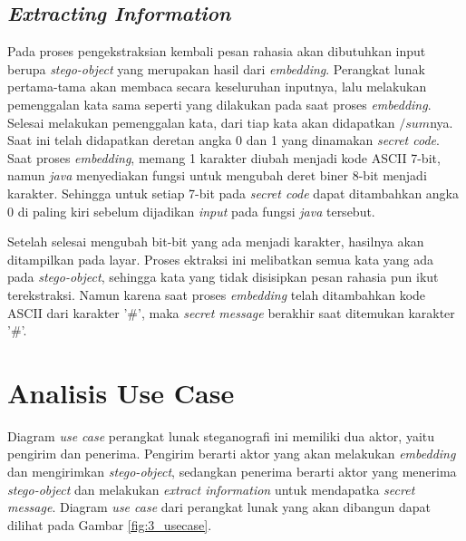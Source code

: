 \subsection{\textit{Extracting Information}}
Pada proses pengekstraksian kembali pesan rahasia akan dibutuhkan input berupa \textit{stego-object} yang merupakan hasil dari \textit{embedding}. Perangkat lunak pertama-tama akan membaca secara keseluruhan inputnya, lalu melakukan pemenggalan kata sama seperti yang dilakukan pada saat proses \textit{embedding}. Selesai melakukan pemenggalan kata, dari tiap kata akan didapatkan $/sum$nya. Saat ini telah didapatkan deretan angka 0 dan 1 yang dinamakan \textit{secret code}. Saat proses \textit{embedding}, memang 1 karakter diubah menjadi kode ASCII 7-bit, namun \textit{java} menyediakan fungsi untuk mengubah deret biner 8-bit menjadi karakter. Sehingga untuk setiap 7-bit pada \textit{secret code} dapat ditambahkan angka 0 di paling kiri sebelum dijadikan \textit{input} pada fungsi \textit{java} tersebut.

Setelah selesai mengubah bit-bit yang ada menjadi karakter, hasilnya akan ditampilkan pada layar. Proses ektraksi ini melibatkan semua kata yang ada pada \textit{stego-object}, sehingga kata yang tidak disisipkan pesan rahasia pun ikut terekstraksi. Namun karena saat proses \textit{embedding} telah ditambahkan kode ASCII dari karakter '\#', maka \textit{secret message} berakhir saat ditemukan karakter '\#'. 

\section{Analisis Use Case}

Diagram \textit{use case} perangkat lunak steganografi ini memiliki dua aktor, yaitu pengirim dan penerima. Pengirim berarti aktor yang akan melakukan \textit{embedding} dan mengirimkan \textit{stego-object}, sedangkan penerima berarti aktor yang menerima \textit{stego-object} dan melakukan \textit{extract information} untuk mendapatka \textit{secret message}. Diagram \textit{use case} dari perangkat lunak yang akan dibangun dapat dilihat pada Gambar \ref{fig:3_usecase}.

